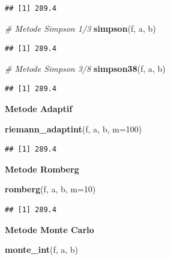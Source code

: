 \documentclass[
]{book}
\newenvironment{Shaded}{\begin{snugshade}}{\end{snugshade}}
\newcommand{\AttributeTok}[1]{\textcolor[rgb]{0.13,0.29,0.53}{#1}}
\newcommand{\CommentTok}[1]{\textcolor[rgb]{0.56,0.35,0.01}{\textit{#1}}}
\newcommand{\DecValTok}[1]{\textcolor[rgb]{0.00,0.00,0.81}{#1}}
\newcommand{\FunctionTok}[1]{\textcolor[rgb]{0.13,0.29,0.53}{\textbf{#1}}}
\newcommand{\NormalTok}[1]{#1}
\theoremstyle{definition}
\theoremstyle{definition}
\theoremstyle{definition}
\theoremstyle{definition}
\theoremstyle{remark}
\begin{document}
\begin{verbatim}
## [1] 289.4
\end{verbatim}

\begin{Shaded}
\begin{Highlighting}[]
\CommentTok{\# Metode Simpson 1/3}
\FunctionTok{simpson}\NormalTok{(f, a, b)}
\end{Highlighting}
\end{Shaded}

\begin{verbatim}
## [1] 289.4
\end{verbatim}

\begin{Shaded}
\begin{Highlighting}[]
\CommentTok{\# Metode Simpson 3/8}
\FunctionTok{simpson38}\NormalTok{(f, a, b)}
\end{Highlighting}
\end{Shaded}

\begin{verbatim}
## [1] 289.4
\end{verbatim}

\textbf{Metode Adaptif}

\begin{Shaded}
\begin{Highlighting}[]
\FunctionTok{riemann\_adaptint}\NormalTok{(f, a, b, }\AttributeTok{m=}\DecValTok{100}\NormalTok{)}
\end{Highlighting}
\end{Shaded}

\begin{verbatim}
## [1] 289.4
\end{verbatim}

\textbf{Metode Romberg}

\begin{Shaded}
\begin{Highlighting}[]
\FunctionTok{romberg}\NormalTok{(f, a, b, }\AttributeTok{m=}\DecValTok{10}\NormalTok{)}
\end{Highlighting}
\end{Shaded}

\begin{verbatim}
## [1] 289.4
\end{verbatim}

\textbf{Metode Monte Carlo}

\begin{Shaded}
\begin{Highlighting}[]
\FunctionTok{monte\_int}\NormalTok{(f, a, b)}
\end{Highlighting}
\end{Shaded}
\end{document}
